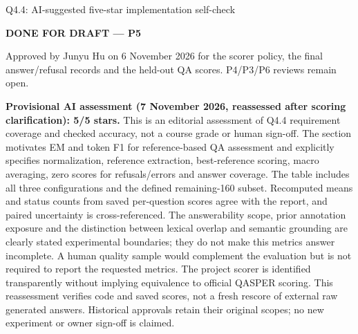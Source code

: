 \begin{review}{Q4.4: AI-suggested five-star implementation self-check}
\colorbox{yellow!45}{\strut\textbf{DONE FOR DRAFT --- P5}}\par
Approved by Junyu Hu on 6 November 2026 for the scorer policy, the final answer/refusal records and the held-out QA scores. P4/P3/P6 reviews remain open.\par\smallskip
{}\quad\textbf{Provisional AI assessment (7 November 2026, reassessed after scoring clarification): 5/5 stars.} This is an editorial assessment of Q4.4 requirement coverage and checked accuracy, not a course grade or human sign-off. The section motivates EM and token F1 for reference-based QA assessment and explicitly specifies normalization, reference extraction, best-reference scoring, macro averaging, zero scores for refusals/errors and answer coverage. The table includes all three configurations and the defined remaining-160 subset. Recomputed means and status counts from saved per-question scores agree with the report, and paired uncertainty is cross-referenced. The answerability scope, prior annotation exposure and the distinction between lexical overlap and semantic grounding are clearly stated experimental boundaries; they do not make this metrics answer incomplete. A human quality sample would complement the evaluation but is not required to report the requested metrics. The project scorer is identified transparently without implying equivalence to official QASPER scoring. This reassessment verifies code and saved scores, not a fresh rescore of external raw generated answers. Historical approvals retain their original scopes; no new experiment or owner sign-off is claimed.
\end{review}

